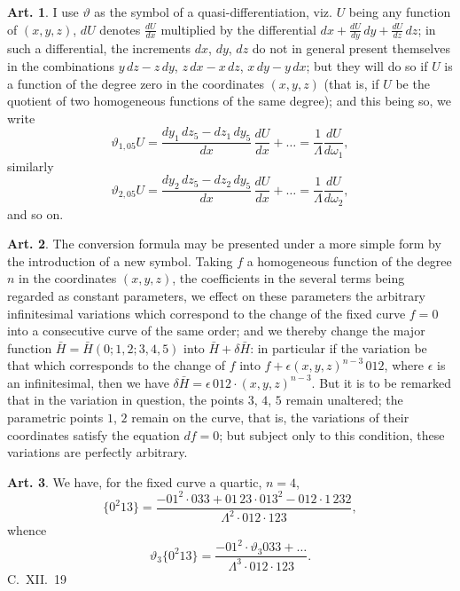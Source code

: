 \documentclass[12pt,a4paper]{article}
\theoremstyle{definition}
\newtheorem{art}{Art.}[section]
\begin{document}
\begin{art}\label{art:60}
I use $\vartheta$ as the symbol of a quasi-differentiation, viz. $U$ being any function of $(x, y, z)$, $dU$ denotes $\frac{dU}{dx}$ multiplied by the differential $dx + \frac{dU}{dy}\,dy + \frac{dU}{dz}\,dz$; in such a differential, the increments $dx$, $dy$, $dz$ do not in general present themselves in the combinations $y\,dz - z\,dy$, $z\,dx - x\,dz$, $x\,dy - y\,dx$; but they will do so if $U$ is a function of the degree zero in the coordinates $(x, y, z)$ (that is, if $U$ be the quotient of two homogeneous functions of the same degree); and this being so, we write
\[
\vartheta_{1,05} U = \frac{dy_1\,dz_5 - dz_1\,dy_5}{dx}\,\frac{dU}{dx} + \ldots = \frac{1}{\Lambda}\frac{dU}{d\omega_1},
\]
similarly
\[
\vartheta_{2,05} U = \frac{dy_2\,dz_5 - dz_2\,dy_5}{dx}\,\frac{dU}{dx} + \ldots = \frac{1}{\Lambda}\frac{dU}{d\omega_2},
\]
and so on.
\end{art}

\begin{art}\label{art:61}
The conversion formula may be presented under a more simple form by the introduction of a new symbol. Taking $f$ a homogeneous function of the degree $n$ in the coordinates $(x, y, z)$, the coefficients in the several terms being regarded as constant parameters, we effect on these parameters the arbitrary infinitesimal variations which correspond to the change of the fixed curve $f = 0$ into a consecutive curve of the same order; and we thereby change the major function $\bar{H} = \bar{H}(0; 1, 2; 3, 4, 5)$ into $\bar{H} + \delta\bar{H}$: in particular if the variation be that which corresponds to the change of $f$ into $f + \epsilon(x, y, z)^{n-3}\,012$, where $\epsilon$ is an infinitesimal, then we have $\delta\bar{H} = \epsilon\,012 \cdot (x, y, z)^{n-3}$. But it is to be remarked that in the variation in question, the points $3$, $4$, $5$ remain unaltered; the parametric points $1$, $2$ remain on the curve, that is, the variations of their coordinates satisfy the equation $df = 0$; but subject only to this condition, these variations are perfectly arbitrary.
\end{art}

\begin{art}\label{art:62}
We have, for the fixed curve a quartic, $n = 4$,
\[
\{0^2 13\} = \frac{-01^2 \cdot 033 + 01\,23 \cdot 013^2 - 012 \cdot 1\,232}{\Lambda^2 \cdot 012 \cdot 123},
\]
whence
\[
\vartheta_3\{0^2 13\} = \frac{-01^2 \cdot \vartheta_3 033 + \ldots}{\Lambda^3 \cdot 012 \cdot 123}.
\]
C.~XII.~19
\end{art}
\end{document}
